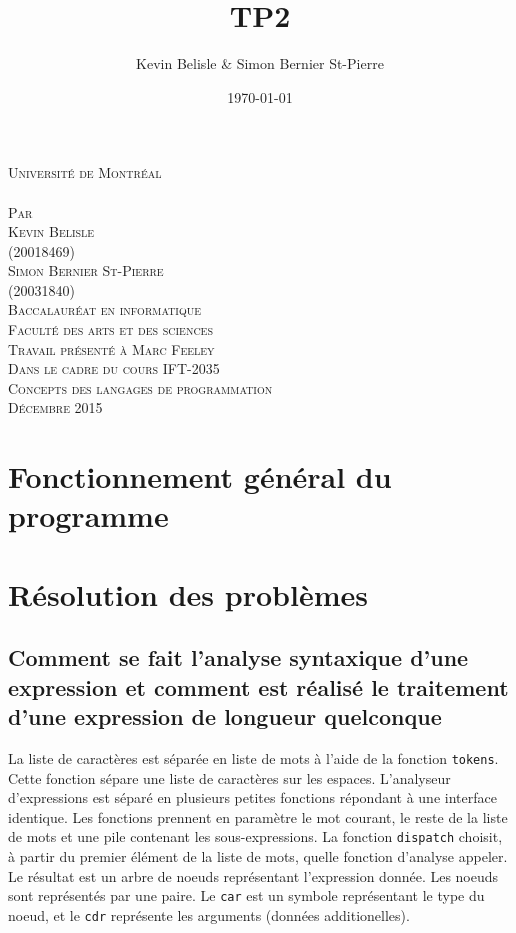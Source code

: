 \documentclass[a4paper,12pt,french]{article}
\date{\today}
\author{Kevin Belisle \& Simon Bernier St-Pierre}
\title{TP2}
\newcommand{\Teacher}{Marc Feeley}
\newcommand{\ClassNum}{IFT-2035}
\newcommand{\ClassName}{Concepts des langages de programmation}
\newcommand{\DateMMMMYYYY}{Décembre 2015}
\newcommand{\Author}{Kevin Belisle}
\newcommand{\Authorr}{Simon Bernier St-Pierre}
\begin{document}
\begin{titlepage}
	\begin{center}
		\textsc{\normalsize Université de Montréal}\\[2.5cm]

		\textsc{\LARGE \@title}\\[2.5cm]

		\textsc{\small Par}\\[0.25cm]
		\textsc{\LARGE \Author}\\[0.25cm]
		\textsc{\normalsize (20018469)}\\[0.25cm]
		\textsc{\LARGE \Authorr}\\[0.25cm]
		\textsc{\normalsize (20031840)}\\[2.5cm]

		\textsc{\normalsize Baccalauréat en informatique}\\
		\textsc{\normalsize Faculté des arts et des sciences}\\[2.5cm]

		\textsc{\small Travail présenté à \Teacher}\\
		\textsc{\small Dans le cadre du cours \ClassNum}\\
		\textsc{\small \ClassName}\\[2.5cm]

		\textsc{\normalsize \DateMMMMYYYY}\\[1.5cm]
	\end{center}
\end{titlepage}
\section{Fonctionnement général du programme}
\section{Résolution des problèmes}
	\renewcommand{\thesubsection}{(\alph{subsection})}
	\subsection{Comment se fait l'analyse syntaxique d'une expression et comment est réalisé le traitement d'une expression de longueur quelconque}
        La liste de caractères est séparée en liste de mots à l'aide de la fonction \lstinline$tokens$. Cette fonction sépare une liste de caractères sur les espaces. L'analyseur d'expressions est séparé en plusieurs petites fonctions répondant à une interface identique. Les fonctions prennent en paramètre le mot courant, le reste de la liste de mots et une pile contenant les sous-expressions. La fonction \lstinline$dispatch$ choisit, à partir du premier élément de la liste de mots, quelle fonction d'analyse appeler. Le résultat est un arbre de noeuds représentant l'expression donnée. Les noeuds sont représentés par une paire. Le \lstinline$car$ est un symbole représentant le type du noeud, et le \lstinline$cdr$ représente les arguments (données additionelles).\\
\end{document}
